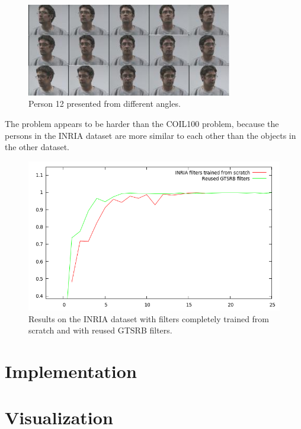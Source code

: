 \documentclass[11pt, a4paper]{article}
\begin{document}
\begin{figure}[h!]
	\centering
	\includegraphics[width=0.8\textwidth]{inria_different_angles}
	\caption{Person 12 presented from different angles.}
	\label{fig:inria_different_angles}
\end{figure}

The problem appears to be harder than the COIL100 problem, because the persons in the INRIA dataset are more similar to each other than the objects in the other dataset.

\begin{figure}[h!]
	\centering
	\includegraphics[width=1\textwidth]{inria_results.png}
	\caption{Results on the INRIA dataset with filters completely trained from scratch and with reused GTSRB filters.}
	\label{fig:inria_results}
\end{figure}

\begin{appendix}
	\section{Implementation}
	\section{Visualization}
\end{appendix}

{}

\end{document}
